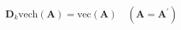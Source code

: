 \begin{equation}
   \mathbf{D}_{k} \mathrm{vech} \left( \mathbf{A} \right)
   =
   \mathrm{vec} \left( \mathbf{A} \right)
   \quad
   \left(
   \mathbf{A}
   =
   \mathbf{A}^{\prime}
   \right)
   \label{eq:linearAlgebra-dcap}
\end{equation}
